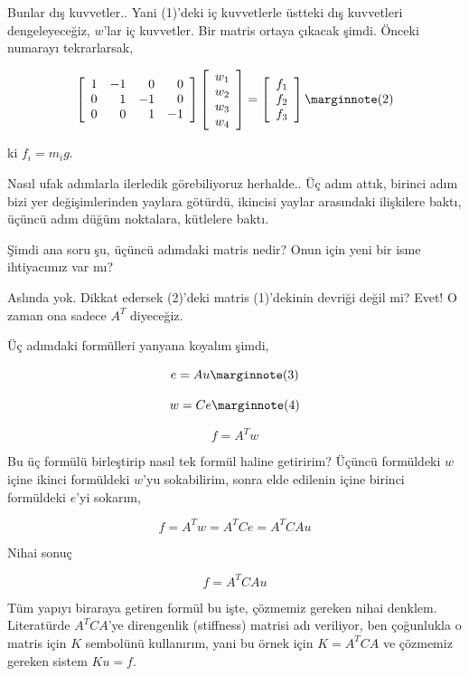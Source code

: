\documentclass[12pt,fleqn]{article}\usepackage{../../common}
\begin{document}
Bunlar dış kuvvetler.. Yani (1)'deki iç kuvvetlerle üstteki dış kuvvetleri
dengeleyeceğiz, $w$'lar iç kuvvetler. Bir matris ortaya çıkacak şimdi.  Önceki
numarayı tekrarlarsak,

$$
\left[\begin{array}{rrrr}
1 & -1 & 0 & 0 \\ 0 & 1 & -1 & 0 \\ 0 & 0 & 1 & -1 
\end{array}\right]
\left[\begin{array}{c}
w_1 \\ w_2 \\ w_3 \\ w_4
\end{array}\right] =
\left[\begin{array}{c}
f_1 \\ f_2 \\ f_3
\end{array}\right]
\mlabel{2}
$$

ki $f_i = m_i g$. 

Nasıl ufak adımlarla ilerledik görebiliyoruz herhalde.. Üç adım attık, birinci
adım bizi yer değişimlerinden yaylara götürdü, ikincisi yaylar arasındaki
ilişkilere baktı, üçüncü adım düğüm noktalara, kütlelere baktı.

Şimdi ana soru şu, üçüncü adımdaki matris nedir? Onun için yeni bir isme
ihtiyacımız var mı?

Aslında yok. Dikkat edersek (2)'deki matris (1)'dekinin devriği değil mi? Evet!
O zaman ona sadece $A^T$ diyeceğiz.

Üç adımdaki formülleri yanyana koyalım şimdi,

$$
e = Au
\mlabel{3}
$$

$$
w = Ce 
\mlabel{4}
$$

$$
f = A^T w
$$

Bu üç formülü birleştirip nasıl tek formül haline getiririm? Üçüncü formüldeki
$w$ içine ikinci formüldeki $w$'yu sokabilirim, sonra elde edilenin içine
birinci formüldeki $e$'yi sokarım,

$$
f = A^T w = A^T C e = A^T C A u
$$

Nihai sonuç

$$
f = A^T C A u
$$

Tüm yapıyı biraraya getiren formül bu işte, çözmemiz gereken nihai denklem.
Literatürde $A^T C A$'ye direngenlik (stiffness) matrisi adı veriliyor, ben
çoğunlukla o matris için $K$ sembolünü kullanırım, yani bu örnek için
$K = A^T C A$ ve çözmemiz gereken sistem $K u = f$.
\end{document}
